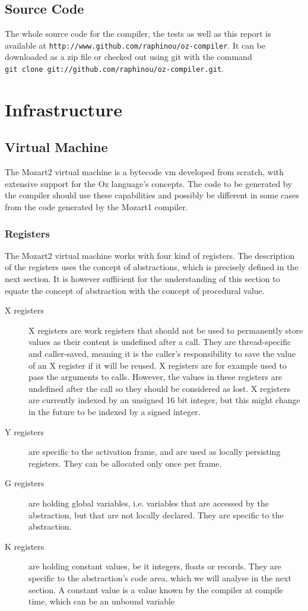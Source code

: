 \documentclass[a4paper]{memoir}
\begin{document}
\section{Source Code}
The whole source code for the compiler, the tests as well as this report is available
at \lstinline!http://www.github.com/raphinou/oz-compiler!. It can be downloaded
as a zip file or checked out using git with the command \\
\lstinline!git clone git://github.com/raphinou/oz-compiler.git!.
\chapter{Infrastructure}
\section{Virtual Machine}
The Mozart2 virtual machine is a bytecode vm developed from scratch, with extensive support for the Oz language's concepts. The code to be generated by the compiler should use these capabilities and possibly be different in some cases from the code generated by the Mozart1 compiler.


\subsection{Registers}\label{sec:intro:registers}
The Mozart2 virtual machine works with four kind of registers. The description of the registers uses the concept of abstractions, which is precisely defined in the next section. It is however sufficient for the understanding of this section to equate the concept of abstraction with the concept of procedural value.
\begin{description}
  \item[X registers]X registers are work registers that should not be used to permanently
    store values as their content is undefined after a call. They are thread-specific and caller-saved, meaning it is the
    caller's responsibility to save the value of an X register if it will be
    reused.  X registers are for example used to pass the arguments to calls. However, the values in these registers are undefined after the call so they should be considered as lost. X registers are currently indexed by an unsigned 16 bit integer, but this might change in the future to be indexed by a signed integer.
  \item[Y registers]are specific to the activation frame, and are used as locally persisting registers. They can be allocated only once per frame.
  \item[G registers] are holding global variables, i.e. variables that are
    accessed by the abstraction, but that are not locally declared. They are
    specific to the abstraction.
  \item[K registers] are holding constant values, be it integers, floats or
    records. They are specific to the abstraction's code area, which we will analyse in the
    next section. A constant value is a value known by the compiler at compile time, which can be an unbound variable
\end{description}
\end{document}

